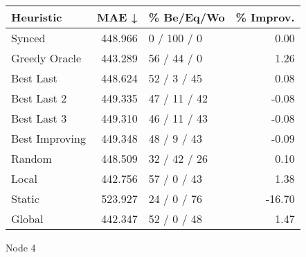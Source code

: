 \begin{tabular}{lrlr}
\toprule
\textbf{Heuristic} & \textbf{MAE ↓} & \textbf{\% Be/Eq/Wo} & \textbf{\% Improv.} \\
\midrule
            Synced &        448.966 &          0 / 100 / 0 &                0.00 \\
     Greedy Oracle &        443.289 &          56 / 44 / 0 &                1.26 \\
         Best Last &        448.624 &          52 / 3 / 45 &                0.08 \\
       Best Last 2 &        449.335 &         47 / 11 / 42 &               -0.08 \\
       Best Last 3 &        449.310 &         46 / 11 / 43 &               -0.08 \\
    Best Improving &        449.348 &          48 / 9 / 43 &               -0.09 \\
            Random &        448.509 &         32 / 42 / 26 &                0.10 \\
             Local &        442.756 &          57 / 0 / 43 &                1.38 \\
            Static &        523.927 &          24 / 0 / 76 &              -16.70 \\
            Global &        442.347 &          52 / 0 / 48 &                1.47 \\
\bottomrule
\end{tabular}
\caption{Node 4}
\label{tab:iid_lr05_le1_bs2_4}
